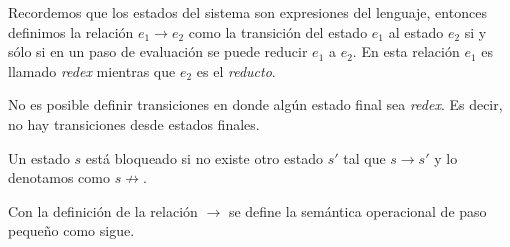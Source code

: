 \documentclass[12pt]{extarticle}
\begin{document}
Recordemos que los estados del sistema son expresiones del lenguaje, entonces definimos  la relación $e_1\to e_2$ como la transición del estado $e_1$ al estado $e_2$ si y sólo si en un paso de evaluación se puede reducir $e_1$ a $e_2$. En esta relación $e_1$ es llamado {\it redex} mientras que $e_2$ es el {\it reducto}.

\begin{remark} No es posible definir transiciones en donde algún estado final sea {\it redex}. Es decir, no hay transiciones desde estados finales.
\end{remark}

\begin{definition} Un estado $s$ está bloqueado si no existe otro estado $s'$ tal que $s\to s'$ y lo denotamos como $s\not\to$.
\end{definition}

Con la definición de la relación $\to$ se define la semántica operacional de paso pequeño como sigue.
\end{document}
